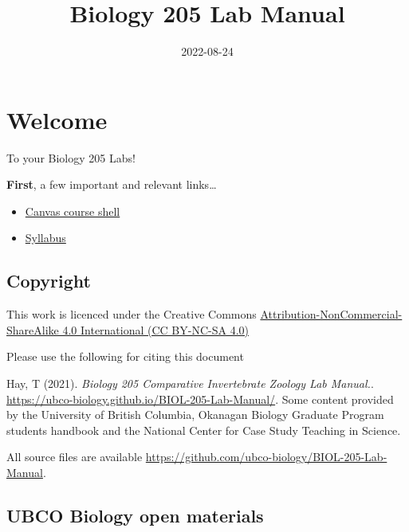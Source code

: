 \documentclass[
]{book}
\title{Biology 205 Lab Manual}
\author{}
\date{\vspace{-2.5em}2022-08-24}
\providecommand{\tightlist}{%
  \setlength{\itemsep}{0pt}\setlength{\parskip}{0pt}}
\begin{document}
\maketitle

{
\setcounter{tocdepth}{1}
\tableofcontents
}
\hypertarget{welcome}{%
\chapter*{Welcome}\label{welcome}}

To your Biology 205 Labs!

\textbf{First}, a few important and relevant links\ldots{}

\begin{itemize}
\tightlist
\item
  \href{https://canvas.ubc.ca/courses/113910}{Canvas course shell}
\item
  \href{https://canvas.ubc.ca/courses/113910/files/21718741?module_item_id=4662232}{Syllabus}
\end{itemize}

\hypertarget{copyright}{%
\section*{Copyright}\label{copyright}}

This work is licenced under the Creative Commons \href{https://creativecommons.org/licenses/by-nc-sa/4.0/}{Attribution-NonCommercial-ShareAlike 4.0 International (CC BY-NC-SA 4.0)}

Please use the following for citing this document

Hay, T (2021). \emph{Biology 205 Comparative Invertebrate Zoology Lab Manual.}. \url{https://ubco-biology.github.io/BIOL-205-Lab-Manual/}. Some content provided by the University of British Columbia, Okanagan Biology Graduate Program students handbook and the National Center for Case Study Teaching in Science.

All source files are available \url{https://github.com/ubco-biology/BIOL-205-Lab-Manual}.

\hypertarget{ubco-biology-open-materials}{%
\section*{UBCO Biology open materials}\label{ubco-biology-open-materials}}
\end{document}
